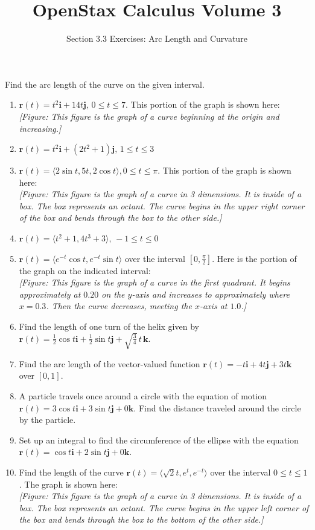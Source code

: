 \documentclass{exercises}
\title{OpenStax Calculus Volume 3}
\subtitle{Section 3.3 Exercises: Arc Length and Curvature}
\author{}
\date{}
\begin{document}
\maketitle


Find the arc length of the curve on the given interval.

\begin{enumerate}[start=1]
\item $\mathbf{r}(t)=t^{2}\mathbf{i}+14t\mathbf{j},\,0\le t\le7$. This portion of the graph is shown here: \\ \textit{[Figure: This figure is the graph of a curve beginning at the origin and increasing.]}
\item $\mathbf{r}(t)=t^{2}\mathbf{i}+(2t^{2}+1)\mathbf{j},\,1\le t\le3$
\item $\mathbf{r}(t)=\langle2\sin t,5t,2\cos t\rangle,0\le t\le \pi$. This portion of the graph is shown here: \\ \textit{[Figure: This figure is the graph of a curve in 3 dimensions. It is inside of a box. The box represents an octant. The curve begins in the upper right corner of the box and bends through the box to the other side.]}
\item $\mathbf{r}(t)=\langle t^{2}+1,4t^{3}+3\rangle,\,-1\le t\le0$
\item $\mathbf{r}(t)=\langle e^{-t}\cos t,e^{-t}\sin t\rangle$ over the interval $[0,\frac{\pi}{2}]$. Here is the portion of the graph on the indicated interval: \\ \textit{[Figure: This figure is the graph of a curve in the first quadrant. It begins approximately at $0.20$ on the $y$-axis and increases to approximately where $x=0.3$. Then the curve decreases, meeting the $x$-axis at $1.0$.]}
\item Find the length of one turn of the helix given by $\mathbf{r}(t)=\frac{1}{2}\cos t\mathbf{i}+\frac{1}{2}\sin t\mathbf{j}+\sqrt{\frac{3}{4}}\,t\,\mathbf{k}$.
\item Find the arc length of the vector-valued function $\mathbf{r}(t)=-t\mathbf{i}+4t\mathbf{j}+3t\mathbf{k}$ over $[0,1]$.
\item A particle travels once around a circle with the equation of motion $\mathbf{r}(t)=3\cos t\mathbf{i}+3\sin t\mathbf{j}+0\mathbf{k}$. Find the distance traveled around the circle by the particle.
\item Set up an integral to find the circumference of the ellipse with the equation $\mathbf{r}(t)=\cos t\mathbf{i}+2\sin t\mathbf{j}+0\mathbf{k}$.
\item Find the length of the curve $\mathbf{r}(t)=\langle \sqrt{2}t,e^{t},e^{-t}\rangle$ over the interval $0\le t\le1$. The graph is shown here: \\ \textit{[Figure: This figure is the graph of a curve in 3 dimensions. It is inside of a box. The box represents an octant. The curve begins in the upper left corner of the box and bends through the box to the bottom of the other side.]}

\end{enumerate}
\end{document}
